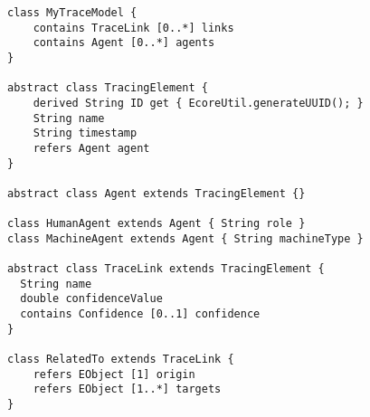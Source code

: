 

\begin{lstlisting}[caption={Tracing element, trace model, and trace links},label=lst:traces,style=mystylexcore,frame=shadowbox, rulesepcolor=\color{blue},boxpos=b]
class MyTraceModel {
	contains TraceLink [0..*] links
	contains Agent [0..*] agents
}

abstract class TracingElement {
	derived String ID get {	EcoreUtil.generateUUID(); }
	String name
	String timestamp 
	refers Agent agent
}

abstract class Agent extends TracingElement {}

class HumanAgent extends Agent { String role }
class MachineAgent extends Agent { String machineType }

abstract class TraceLink extends TracingElement {
  String name
  double confidenceValue
  contains Confidence [0..1] confidence
}

class RelatedTo extends TraceLink {
	refers EObject [1] origin
	refers EObject [1..*] targets
}
\end{lstlisting}
